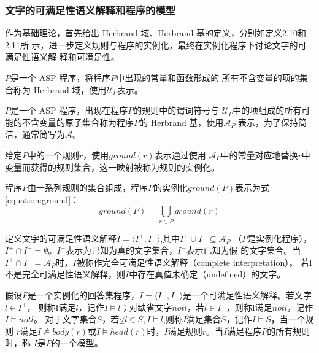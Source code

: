 \subsubsection{文字的可满足性语义解释和程序的模型}
作为基础理论，首先给出 Herbrand 域、Herbrand 基的定义，分别如定义2.10和2.11所
示，进一步定义规则与程序的实例化，最终在实例化程序下讨论文字的可满足性语义解
释和可满足性。
\begin{definition}[Herbrand基]
    $P$是一个 ASP 程序，将程序$P$中出现的常量和函数形成的
    所有不含变量的项的集合称为 Herbrand 域，使用$\mathcal{U}_P$表示。
\end{definition}
\begin{definition}[Herbrand域]
    $P$是一个 ASP 程序，出现在程序$P$的规则中的谓词符号与
$\mathcal{U}_P$中的项组成的所有可能的不含变量的原子集合称为程序$P$的 Herbrand 基，使用$\mathcal{A}_P$
表示，为了保持简洁，通常简写为$\mathcal{A}$。
\end{definition}
\begin{definition}[规则的实例化]
    给定$P$中的一个规则$r$，使用$ground(r)$表示通过使用
$\mathcal{A}_P$中的常量对应地替换$r$中变量而获得的规则集合，这一映射被称为规则的实例化。
\end{definition}
\begin{definition}[程序的实例化]
    程序$P$由一系列规则的集合组成，程序$P$的实例化$ground(P)$表示为式\eqref{equation:ground}：
    \begin{equation}
    ground(P)=\bigcup_{r \in P}ground(r) \label{equation:ground}
    \end{equation}
\end{definition}
\begin{definition}[文字的可满足性语义解释]
    定义文字的可满足性语义解释$I=\langle I^+,I^- \rangle$,其中$I^+\cup I^-\subseteq \mathcal{A}_P$
    （$P$是实例化程序），$I^+\cap I^-=\emptyset$。$I^+$表示为已知为真的文字集合，$I^-$表示已知为假
    的文字集合。当$I^+\cap I^-=\mathcal{A}_P$时，$I$被称作完全可满足性语义解释（complete interpretation）。
    若I不是完全可满足性语义解释，则$I$中存在真值未确定（undefined）的文字。
\end{definition}
\begin{definition}[程序的模型]
    假设$P$是一个实例化的回答集程序，$I=\langle I^+,I^- \rangle$是一个可满足性语义解释。若文字$l \in I^+$，
    则称I满足$l$，记作$I\models l$；对缺省文字$not l$，若$l \in I^-$，则称I满足$not l$，记作$I\models not l$。
    对于文字集合$S$，若$\veebar l \in S,I \models l$,则称$I$满足集合$S$，记作$I \models S$，当一个规则
    $r$满足$I \nvDash body(r)$或$I \models head(r)$时，$I$满足规则$r$。当$I$满足程序$P$的所有规则时，称
    $I$是$P$的一个模型。
\end{definition}
